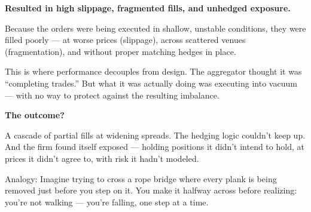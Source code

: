 \textbf{Resulted in high slippage, fragmented fills, and unhedged exposure.}

Because the orders were being executed in shallow, unstable conditions, they were filled poorly — at worse prices 
(slippage), across scattered venues (fragmentation), and without proper matching hedges in place.

This is where performance decouples from design. The aggregator thought it was “completing trades.” But what it was 
actually doing was executing into vacuum — with no way to protect against the resulting imbalance.


\textbf{The outcome?}

A cascade of partial fills at widening spreads. The hedging logic couldn’t keep up. And the firm found itself exposed 
— holding positions it didn’t intend to hold, at prices it didn’t agree to, with risk it hadn’t modeled.

Analogy:
Imagine trying to cross a rope bridge where every plank is being removed just before you step on it. You make it 
halfway across before realizing: you’re not walking — you’re falling, one step at a time.


